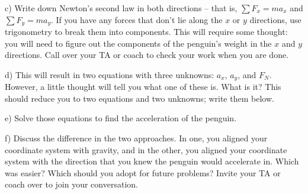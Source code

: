 \documentclass[12pt]{article}
\begin{document}
		c) Write down Newton's second law in both directions -- that is, $\sum F_x = ma_x$ and $\sum F_y = ma_y$.
		If you have any forces that don't lie along the $x$ or $y$ directions, use trigonometry to break them into components.
		This will require some thought: you will need to figure out the components of the
		penguin's weight in the $x$ and $y$ directions. Call over your TA or coach to check your work when you are done.
		
		\vspace{3in}
		\newpage
		
		d) This will result in two equations with three unknowns: $a_x$, $a_y$, and $F_N$. However, a little thought will
		tell you what one of these is. What is it? This should reduce you to two equations and two unknowns; write them below.
		
		\vspace{2in}
		
		e) Solve those equations to find the acceleration of the penguin.
		
		\vspace{2in}
		
		f) Discuss the difference in the two approaches. In one, you aligned your coordinate system with gravity, and in the other, you aligned your coordinate system with the direction that you knew the penguin would accelerate in. Which was easier? Which
		should you adopt for future problems? Invite your TA or coach over to join your conversation.
		
\end{document}

